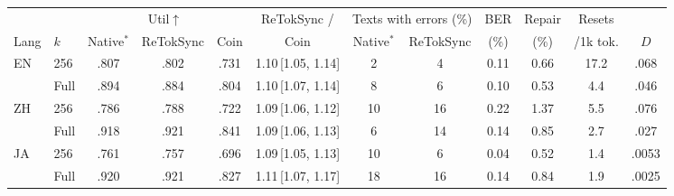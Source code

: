 \begin{tabular}{@{}ll ccc c cc ccc c@{}}
\toprule
 & & \multicolumn{3}{c}{Util$\uparrow$} & ReTokSync / & \multicolumn{2}{c}{Texts with errors (\%)} & BER & Repair & Resets & \\
\cmidrule(lr){3-5}\cmidrule(lr){7-8}
Lang & $k$ & Native$^\ast$ & ReTokSync & Coin & Coin & Native$^\ast$ & ReTokSync & (\%) & (\%) & /1k tok. & $D$ \\
\midrule
 \multirow{2}{*}{EN} & 256 & .807 & .802 & .731 & 1.10\,{\scriptsize[1.05, 1.14]} & 2 & 4 & 0.11 & 0.66 & 17.2 & .068 \\
  & Full & .894 & .884 & .804 & 1.10\,{\scriptsize[1.07, 1.14]} & 8 & 6 & 0.10 & 0.53 & 4.4 & .046 \\
\midrule
 \multirow{2}{*}{ZH} & 256 & .786 & .788 & .722 & 1.09\,{\scriptsize[1.06, 1.12]} & 10 & 16 & 0.22 & 1.37 & 5.5 & .076 \\
  & Full & .918 & .921 & .841 & 1.09\,{\scriptsize[1.06, 1.13]} & 6 & 14 & 0.14 & 0.85 & 2.7 & .027 \\
\midrule
 \multirow{2}{*}{JA} & 256 & .761 & .757 & .696 & 1.09\,{\scriptsize[1.05, 1.13]} & 10 & 6 & 0.04 & 0.52 & 1.4 & .0053 \\
  & Full & .920 & .921 & .827 & 1.11\,{\scriptsize[1.07, 1.17]} & 18 & 16 & 0.14 & 0.84 & 1.9 & .0025 \\
\bottomrule
\end{tabular}
